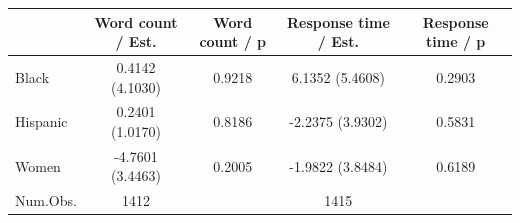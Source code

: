 
\begin{tabular}[t]{lcccc}
\toprule
  & Word count / Est. & Word count / p & Response time / Est. & Response time / p\\
\midrule
Black & 0.4142 
(4.1030) & 0.9218 & 6.1352 
(5.4608) & 0.2903\\
Hispanic & 0.2401 
(1.0170) & 0.8186 & -2.2375 
(3.9302) & 0.5831\\
Women & -4.7601 
(3.4463) & 0.2005 & -1.9822 
(3.8484) & 0.6189\\
\midrule
Num.Obs. & 1412 &  & 1415 & \\
\bottomrule
\end{tabular}

